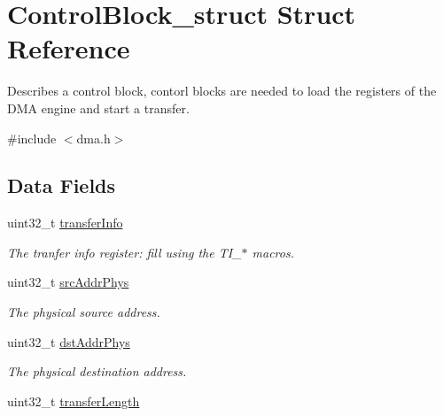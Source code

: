 \hypertarget{structControlBlock__struct}{}\section{Control\+Block\+\_\+struct Struct Reference}
\label{structControlBlock__struct}


Describes a control block, contorl blocks are needed to load the registers of the D\+MA engine and start a transfer.  




{\ttfamily \#include $<$dma.\+h$>$}

\subsection*{Data Fields}
\begin{DoxyCompactItemize}
\item 
uint32\+\_\+t \hyperlink{structControlBlock__struct_ab8ff6b85cb102ef270411fed5080a161}{transfer\+Info}\hypertarget{structControlBlock__struct_ab8ff6b85cb102ef270411fed5080a161}{}\label{structControlBlock__struct_ab8ff6b85cb102ef270411fed5080a161}

\begin{DoxyCompactList}\small\item\em The tranfer info register\+: fill using the T\+I\+\_\+$\ast$ macros. \end{DoxyCompactList}\item 
uint32\+\_\+t \hyperlink{structControlBlock__struct_a4086d1e8c9c670cbe655edaca7873082}{src\+Addr\+Phys}\hypertarget{structControlBlock__struct_a4086d1e8c9c670cbe655edaca7873082}{}\label{structControlBlock__struct_a4086d1e8c9c670cbe655edaca7873082}

\begin{DoxyCompactList}\small\item\em The physical source address. \end{DoxyCompactList}\item 
uint32\+\_\+t \hyperlink{structControlBlock__struct_aa24e1afa56f4f0fbc4aac9e8919eef5a}{dst\+Addr\+Phys}\hypertarget{structControlBlock__struct_aa24e1afa56f4f0fbc4aac9e8919eef5a}{}\label{structControlBlock__struct_aa24e1afa56f4f0fbc4aac9e8919eef5a}

\begin{DoxyCompactList}\small\item\em The physical destination address. \end{DoxyCompactList}\item 
uint32\+\_\+t \hyperlink{structControlBlock__struct_ab63d26648bdb996d136f2e25bd383a76}{transfer\+Length}\hypertarget{structControlBlock__struct_ab63d26648bdb996d136f2e25bd383a76}{}\label{structControlBlock__struct_ab63d26648bdb996d136f2e25bd383a76}


\end{DoxyCompactItemize}
